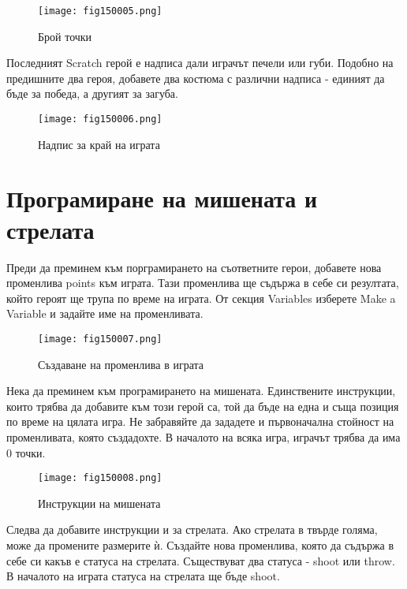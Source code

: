 \begin{figure}[H]
  \centering
  \texttt{[image: fig150005.png]}
  \caption{Брой точки}
\label{fig150005}
\end{figure}

Последният Scratch герой е надписа дали играчът печели или губи. Подобно на предишните два героя, добавете два костюма с различни надписа - единият да бъде за победа, а другият за загуба.

\begin{figure}[H]
  \centering
  \texttt{[image: fig150006.png]}
  \caption{Надпис за край на играта}
\label{fig150006}
\end{figure}

\section{Програмиране на мишената и стрелата}
Преди да преминем към порграмирането на съответните герои, добавете нова променлива points към играта. Тази променлива ще съдържа в себе си резултата, който героят ще трупа по време на играта. От секция Variables изберете Make a Variable и задайте име на променливата.

\begin{figure}[H]
  \centering
  \texttt{[image: fig150007.png]}
  \caption{Създаване на променлива в играта}
\label{fig150007}
\end{figure}

Нека да преминем към програмирането на мишената. Единствените инструкции, които трябва да добавите към този герой са, той да бъде на една и съща позиция по време на цялата игра. Не забравяйте да зададете и първоначална стойност на променливата, която създадохте. В началото на всяка игра, играчът трябва да има 0 точки.

\begin{figure}[H]
  \centering
  \texttt{[image: fig150008.png]}
  \caption{Инструкции на мишената}
\label{fig150008}
\end{figure}

Следва да добавите инструкции и за стрелата. Ако стрелата в твърде голяма, може да промените размерите ѝ. Създайте нова променлива, която да съдържа в себе си какъв е статуса на стрелата. Съществуват два статуса - shoot или throw. В началото на играта статуса на стрелата ще бъде shoot.

